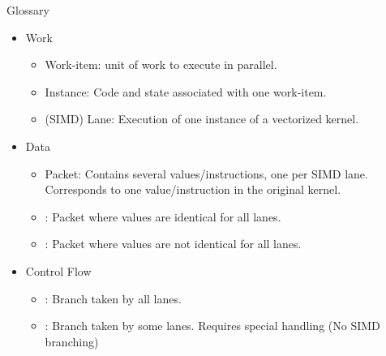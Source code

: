 \begin{frame}{Glossary}

\begin{itemize}
    \item Work
    \begin{itemize}
        \item Work-item: unit of work to execute in parallel.
        \item Instance: Code and state associated with one work-item.
        \item (SIMD) Lane: Execution of one instance of a vectorized kernel.
        \end{itemize}
        
    \item Data
    \begin{itemize}
        \item Packet: Contains several values/instructions, one per SIMD lane. Corresponds to one value/instruction in the original kernel.
        \item {}: Packet where values are identical for all lanes.
        \item {}: Packet where values are not identical for all lanes.
        \end{itemize}

    \item Control Flow
    \begin{itemize}
        \item {}: Branch taken by all lanes.
        \item {}: Branch taken by some lanes. Requires special handling (No SIMD branching)
    \end{itemize}
\end{itemize}

\end{frame}
